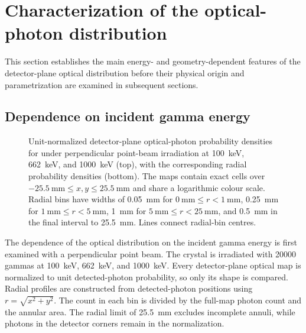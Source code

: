 \section{Characterization of the  optical-photon distribution}

This section establishes the main energy- and geometry-dependent features of the detector-plane optical distribution before their physical origin and parametrization are examined in subsequent sections.

\subsection{Dependence on incident gamma energy}
\label{sec:cebr-energy-scan}

\begin{figure}[H]
  \centering
  \captionsetup{font=small}
  \caption{Unit-normalized detector-plane optical-photon probability densities for  under perpendicular point-beam irradiation at \qty{100}{\kilo\electronvolt}, \qty{662}{\kilo\electronvolt}, and \qty{1000}{\kilo\electronvolt} (top), with the corresponding radial probability densities (bottom). The maps contain exact  cells over $\qty{-25.5}{\milli\metre}\leq x,y\leq\qty{25.5}{\milli\metre}$ and share a logarithmic colour scale. Radial bins have widths of \qty{0.05}{\milli\metre} for $\qty{0}{\milli\metre}\leq r<\qty{1}{\milli\metre}$, \qty{0.25}{\milli\metre} for $\qty{1}{\milli\metre}\leq r<\qty{5}{\milli\metre}$, \qty{1}{\milli\metre} for $\qty{5}{\milli\metre}\leq r<\qty{25}{\milli\metre}$, and \qty{0.5}{\milli\metre} in the final interval to \qty{25.5}{\milli\metre}. Lines connect radial-bin centres.}
  \label{fig:energy-maps}
\end{figure}

The dependence of the optical distribution on the incident gamma energy is first examined with a perpendicular point beam. The   crystal is irradiated with \num{20000} gammas at \qty{100}{\kilo\electronvolt}, \qty{662}{\kilo\electronvolt}, and \qty{1000}{\kilo\electronvolt}. Every detector-plane optical map is normalized to unit detected-photon probability, so only its shape is compared. Radial profiles are constructed from detected-photon positions using $r=\sqrt{x^2+y^2}$. The count in each bin is divided by the full-map photon count and the annular area. The radial limit of \qty{25.5}{\milli\metre} excludes incomplete annuli, while photons in the detector corners remain in the normalization.



